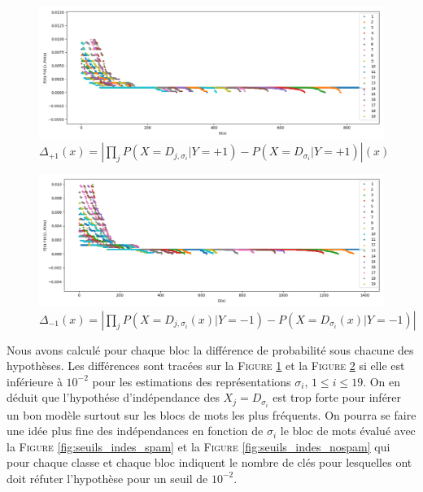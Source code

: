 \documentclass[a4paper, french]{article}
\begin{document}
\begin{figure}[h]
\begin{center}
    \caption{%
    $\Delta_{+1}(x)=\left|\prod _j P(X=D_{j,\sigma_i}|Y=+1)-P(X=D_{\sigma_i}|Y=+1)\right|(x)$}
    \label{fig:blocs_indes_spam}
    \includegraphics[width=13cm]{blocs_indes_spam}
\end{center}
\end{figure}
\begin{figure}[h]
\begin{center}
    \caption{%
    $\Delta_{-1}(x)=\left|\prod _j P(X=D_{j,\sigma_i}(x)|Y=-1)-P(X=D_{\sigma_i}(x)|Y=-1)\right|$}
    \label{fig:blocs_indes_nospam}
    \includegraphics[width=13cm]{blocs_indes_nospam}
\end{center}
\end{figure}

Nous avons calcul\'e pour chaque bloc la diff\'erence de probabilit\'e
sous chacune des hypoth\`eses. Les diff\'erences sont trac\'ees sur la
F\textsc{igure} \ref{fig:blocs_indes_spam} et la F\textsc{igure}
\ref{fig:blocs_indes_nospam} si elle est inf\'erieure \`a $10^{-2}$ 
pour les estimations des repr\'esentations $\sigma_i$, $1\leq i\leq 19$.
On en d\'eduit que l'hypoth\'ese d'ind\'ependance des $X_j=D_{\sigma_i}$
est trop forte pour inf\'erer un bon mod\`ele surtout sur les blocs de
mots les plus fr\'equents. On pourra se faire une id\'ee plus fine 
des ind\'ependances en fonction de $\sigma_i$ le bloc de mots 
\'evalu\'e avec la F\textsc{igure} \ref{fig:seuils_indes_spam} et
la F\textsc{igure} \ref{fig:seuils_indes_nospam} qui pour chaque classe
et chaque bloc indiquent le nombre de cl\'es pour lesquelles ont doit
r\'efuter l'hypoth\`ese pour un seuil de $10^{-2}$.
\end{document}

